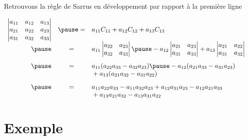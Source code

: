 \begin{frame}

\begin{exemple}
Retrouvons la règle de Sarrus en développement par rapport à la première ligne

\pause
$$\begin{array}{rcl}
\left|\begin{matrix}
a_{11}&a_{12}&a_{13}\\
a_{21}&a_{22}&a_{23}\\
a_{31}&a_{32}&a_{33}
\end{matrix}\right|& \pause = &a_{11}C_{11}+a_{12}C_{12}+a_{13}C_{13}\\ \pause
&=&a_{11}\left|\begin{matrix}
a_{22}&a_{23}\\
a_{32}&a_{33}
\end{matrix}\right| \pause - a_{12}\left|\begin{matrix}
a_{21}&a_{23}\\
a_{31}&a_{33}
\end{matrix}\right|+a_{13}\left|\begin{matrix}
a_{21}&a_{22}\\
a_{31}&a_{32}
\end{matrix}\right| \vspace{.3cm} \\ \pause
&=&a_{11}(a_{22}a_{33}-a_{32}a_{23}) \pause -a_{12}(a_{21}a_{33}-a_{31}a_{23})\\ 
&&{}+a_{13}(a_{21}a_{32}-a_{31}a_{22}) \vspace{.3cm} \\ \pause
&=&a_{11}a_{22}a_{33}-a_{11}a_{32}a_{23}+a_{12}a_{31}a_{23}-a_{12}a_{21}a_{33}\\ 
&&{}+a_{13}a_{21}a_{32}-a_{13}a_{31}a_{22}
\end{array}$$
\end{exemple}

\end{frame}



\section{Exemple}

